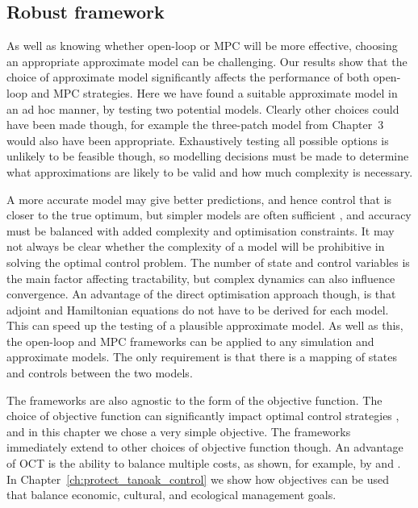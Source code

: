 \subsection{Robust framework}

As well as knowing whether open-loop or MPC will be more effective, choosing an appropriate approximate model can be challenging. Our results show that the choice of approximate model significantly affects the performance of both open-loop and MPC strategies. Here we have found a suitable approximate model in an ad hoc manner, by testing two potential models. Clearly other choices could have been made though, for example the three-patch model from Chapter~3 would also have been appropriate. Exhaustively testing all possible options is unlikely to be feasible though, so modelling decisions must be made to determine what approximations are likely to be valid and how much complexity is necessary.

A more accurate model may give better predictions, and hence control that is closer to the true optimum, but simpler models are often sufficient \citep{thompson_effect_2018}, and accuracy must be balanced with added complexity and optimisation constraints. It may not always be clear whether the complexity of a model will be prohibitive in solving the optimal control problem. The number of state and control variables is the main factor affecting tractability, but complex dynamics can also influence convergence. An advantage of the direct optimisation approach though, is that adjoint and Hamiltonian equations do not have to be derived for each model. This can speed up the testing of a plausible approximate model. As well as this, the open-loop and MPC frameworks can be applied to any simulation and approximate models. The only requirement is that there is a mapping of states and controls between the two models. 

The frameworks are also agnostic to the form of the objective function. The choice of objective function can significantly impact optimal control strategies \citep{probert_decision_2016}, and in this chapter we chose a very simple objective. The frameworks immediately extend to other choices of objective function though. An advantage of OCT is the ability to balance multiple costs, as shown, for example, by \citet{brown_role_2011} and \citet{bokil_optimal_2019}. In Chapter~\ref{ch:protect_tanoak_control} we show how objectives can be used that balance economic, cultural, and ecological management goals.

